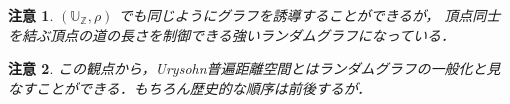 \documentclass[leqno, 12pt]{jsarticle}
\newtheorem*{rmk}{注意}
\newcommand{\zz}{\mathbb{Z}}
\begin{document}
\begin{rmk}
$(\mathbb{U}_{\zz}, \rho)$
でも同じようにグラフを誘導することができるが，
頂点同士を結ぶ頂点の道の長さを制御できる強いランダムグラフになっている．
\end{rmk}

\begin{rmk}
この観点から，Urysohn普遍距離空間とはランダムグラフの一般化と見なすことができる．もちろん歴史的な順序は前後するが．
\end{rmk}






\end{document}
